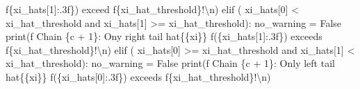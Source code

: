 \documentclass[
  letterpaper,
  DIV=11,
  numbers=noendperiod]{scrartcl}
\newenvironment{Shaded}{\begin{snugshade}}{\end{snugshade}}
\newcommand{\BuiltInTok}[1]{\textcolor[rgb]{0.00,0.23,0.31}{#1}}
\newcommand{\CharTok}[1]{\textcolor[rgb]{0.13,0.47,0.30}{#1}}
\newcommand{\ControlFlowTok}[1]{\textcolor[rgb]{0.00,0.23,0.31}{#1}}
\newcommand{\DecValTok}[1]{\textcolor[rgb]{0.68,0.00,0.00}{#1}}
\newcommand{\KeywordTok}[1]{\textcolor[rgb]{0.00,0.23,0.31}{#1}}
\newcommand{\NormalTok}[1]{\textcolor[rgb]{0.00,0.23,0.31}{#1}}
\newcommand{\OperatorTok}[1]{\textcolor[rgb]{0.37,0.37,0.37}{#1}}
\newcommand{\SpecialCharTok}[1]{\textcolor[rgb]{0.37,0.37,0.37}{#1}}
\newcommand{\SpecialStringTok}[1]{\textcolor[rgb]{0.13,0.47,0.30}{#1}}
\newcommand{\VariableTok}[1]{\textcolor[rgb]{0.07,0.07,0.07}{#1}}
\begin{document}
\begin{Shaded}
\begin{Highlighting}[]
            \SpecialStringTok{f\textquotesingle{}}\SpecialCharTok{\{}\NormalTok{xi\_hats[}\DecValTok{1}\NormalTok{]}\SpecialCharTok{:.3f\}}\SpecialStringTok{) exceed \textquotesingle{}}
            \SpecialStringTok{f\textquotesingle{}}\SpecialCharTok{\{}\NormalTok{xi\_hat\_threshold}\SpecialCharTok{\}}\SpecialStringTok{!}\CharTok{\textbackslash{}n}\SpecialStringTok{\textquotesingle{}}\NormalTok{)}
    \ControlFlowTok{elif}\NormalTok{ (    xi\_hats[}\DecValTok{0}\NormalTok{] }\OperatorTok{\textless{}}\NormalTok{ xi\_hat\_threshold }
          \KeywordTok{and}\NormalTok{ xi\_hats[}\DecValTok{1}\NormalTok{] }\OperatorTok{\textgreater{}=}\NormalTok{ xi\_hat\_threshold):}
\NormalTok{      no\_warning }\OperatorTok{=} \VariableTok{False}
      \BuiltInTok{print}\NormalTok{(}\SpecialStringTok{f\textquotesingle{}  Chain }\SpecialCharTok{\{}\NormalTok{c }\OperatorTok{+} \DecValTok{1}\SpecialCharTok{\}}\SpecialStringTok{: Ony right tail hat}\CharTok{\{\{}\SpecialStringTok{xi}\CharTok{\}\}}\SpecialStringTok{ \textquotesingle{}}
            \SpecialStringTok{f\textquotesingle{}(}\SpecialCharTok{\{}\NormalTok{xi\_hats[}\DecValTok{1}\NormalTok{]}\SpecialCharTok{:.3f\}}\SpecialStringTok{) exceeds \textquotesingle{}}
            \SpecialStringTok{f\textquotesingle{}}\SpecialCharTok{\{}\NormalTok{xi\_hat\_threshold}\SpecialCharTok{\}}\SpecialStringTok{!}\CharTok{\textbackslash{}n}\SpecialStringTok{\textquotesingle{}}\NormalTok{)}
    \ControlFlowTok{elif}\NormalTok{ (    xi\_hats[}\DecValTok{0}\NormalTok{] }\OperatorTok{\textgreater{}=}\NormalTok{ xi\_hat\_threshold }
          \KeywordTok{and}\NormalTok{ xi\_hats[}\DecValTok{1}\NormalTok{] }\OperatorTok{\textless{}}\NormalTok{ xi\_hat\_threshold):}
\NormalTok{      no\_warning }\OperatorTok{=} \VariableTok{False}
      \BuiltInTok{print}\NormalTok{(}\SpecialStringTok{f\textquotesingle{}  Chain }\SpecialCharTok{\{}\NormalTok{c }\OperatorTok{+} \DecValTok{1}\SpecialCharTok{\}}\SpecialStringTok{: Only left tail hat}\CharTok{\{\{}\SpecialStringTok{xi}\CharTok{\}\}}\SpecialStringTok{ \textquotesingle{}}
            \SpecialStringTok{f\textquotesingle{}(}\SpecialCharTok{\{}\NormalTok{xi\_hats[}\DecValTok{0}\NormalTok{]}\SpecialCharTok{:.3f\}}\SpecialStringTok{) exceeds \textquotesingle{}}
            \SpecialStringTok{f\textquotesingle{}}\SpecialCharTok{\{}\NormalTok{xi\_hat\_threshold}\SpecialCharTok{\}}\SpecialStringTok{!}\CharTok{\textbackslash{}n}\SpecialStringTok{\textquotesingle{}}\NormalTok{)}
  

\end{Highlighting}
\end{Shaded}
\end{document}
